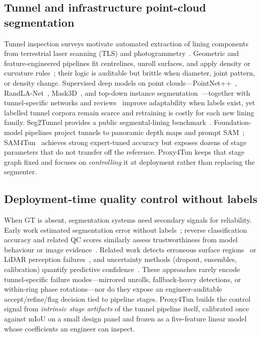 \documentclass[a4paper,fleqn]{cas-dc}
\begin{document}
\subsection{Tunnel and infrastructure point-cloud segmentation}

Tunnel inspection surveys motivate automated extraction of lining components from terrestrial laser scanning (TLS) and photogrammetry~\cite{attard2018,montero2015,sjolander2023towards}. Geometric and feature-engineered pipelines fit centrelines, unroll surfaces, and apply density or curvature rules~\cite{weidner2024generalized,huang2021bim,wang2025automated}; their logic is auditable but brittle when diameter, joint pattern, or density change. Supervised deep models on point clouds---PointNet++~\cite{qi2017pointnet}, RandLA-Net~\cite{hu2020randla}, Mask3D~\cite{schult2023mask3d}, and top-down instance segmentation~\cite{kolodiazhnyi2024td3d}---together with tunnel-specific networks and reviews~\cite{duan2023high,su2024review,cha2024deep,wang2026serialformer,ye2026maintenance} improve adaptability when labels exist, yet labelled tunnel corpora remain scarce and retraining is costly for each new lining family. Seg2Tunnel provides a public segmental-lining benchmark~\cite{lin2024seg2tunnel}. Foundation-model pipelines project tunnels to panoramic depth maps and prompt SAM~\cite{kirillov2023sam,ye2024sam,ge2024cracksam}; SAM4Tun~\cite{ye2025sam4tun} achieves strong expert-tuned accuracy but exposes dozens of stage parameters that do not transfer off the reference. Proxy4Tun keeps that stage graph fixed and focuses on \emph{controlling} it at deployment rather than replacing the segmenter.

\subsection{Deployment-time quality control without labels}

When GT is absent, segmentation systems need secondary signals for reliability. Early work estimated segmentation error without labels~\cite{kohlberger2012segmentationError}; reverse classification accuracy and related QC scores similarly assess trustworthiness from model behaviour or image evidence~\cite{valindria2017rca,robinson2018segmentationQuality,fournel2021segmentationQC,cosarinsky2025inContextRCA}. Related work detects erroneous surface regions~\cite{zaman2023erroneousSurfaceRegions} or LiDAR perception failures~\cite{bogdoll2025lidarFailureDetection}, and uncertainty methods (dropout, ensembles, calibration) quantify predictive confidence~\cite{gal2016dropout,kendall2017uncertainties,lakshminarayanan2017deepEnsembles,guo2017calibration,vassilev2024uncertaintyInfrastructure}. These approaches rarely encode tunnel-specific failure modes---mirrored unrolls, fallback-heavy detections, or within-ring phase rotations---nor do they expose an engineer-auditable accept/refine/flag decision tied to pipeline stages. Proxy4Tun builds the control signal from \emph{intrinsic stage artifacts} of the tunnel pipeline itself, calibrated once against mIoU on a small design panel and frozen as a five-feature linear model whose coefficients an engineer can inspect.
\end{document}
